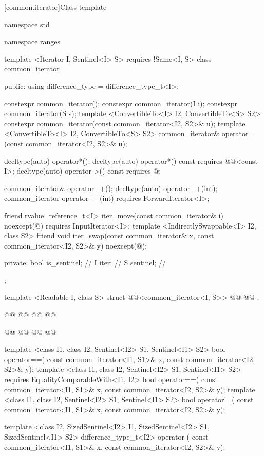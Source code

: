 [common.iterator]{Class template }

%
\begin{codeblock}
namespace std { namespace ranges {
  template <Iterator I, Sentinel<I> S>
    requires !Same<I, S>
  class common_iterator {
  public:
    using difference_type = difference_type_t<I>;

    constexpr common_iterator();
    constexpr common_iterator(I i);
    constexpr common_iterator(S s);
    template <ConvertibleTo<I> I2, ConvertibleTo<S> S2>
      constexpr common_iterator(const common_iterator<I2, S2>& u);
    template <ConvertibleTo<I> I2, ConvertibleTo<S> S2>
      common_iterator& operator=(const common_iterator<I2, S2>& u);

    decltype(auto) operator*();
    decltype(auto) operator*() const
      requires @@<const I>;
    decltype(auto) operator->() const
      requires @\seebelow@;

    common_iterator& operator++();
    decltype(auto) operator++(int);
    common_iterator operator++(int)
      requires ForwardIterator<I>;

    friend rvalue_reference_t<I> iter_move(const common_iterator& i)
      noexcept(@\seebelow@)
        requires InputIterator<I>;
    template <IndirectlySwappable<I> I2, class S2>
      friend void iter_swap(const common_iterator& x, const common_iterator<I2, S2>& y)
        noexcept(@\seebelow@);

  private:
    bool is_sentinel; // \expos
    I iter;           // \expos
    S sentinel;       // \expos
  };

  template <Readable I, class S>
  struct @@<common_iterator<I, S>> {
    @@
    @@
  };

  @@
  @@
    @@
  @\removed{\};}@

  @@
  @@
    @@
  @\removed{\};}@

  template <class I1, class I2, Sentinel<I2> S1, Sentinel<I1> S2>
  bool operator==(
    const common_iterator<I1, S1>& x, const common_iterator<I2, S2>& y);
  template <class I1, class I2, Sentinel<I2> S1, Sentinel<I1> S2>
    requires EqualityComparableWith<I1, I2>
  bool operator==(
    const common_iterator<I1, S1>& x, const common_iterator<I2, S2>& y);
  template <class I1, class I2, Sentinel<I2> S1, Sentinel<I1> S2>
  bool operator!=(
    const common_iterator<I1, S1>& x, const common_iterator<I2, S2>& y);

  template <class I2, SizedSentinel<I2> I1, SizedSentinel<I2> S1, SizedSentinel<I1> S2>
  difference_type_t<I2> operator-(
    const common_iterator<I1, S1>& x, const common_iterator<I2, S2>& y);
}}
\end{codeblock}
